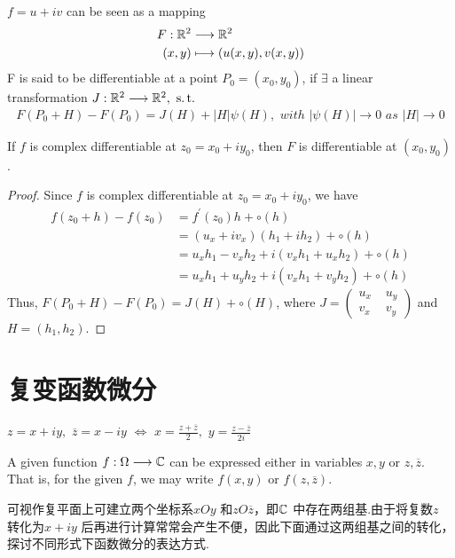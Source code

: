 	\newpage
	$f = u + iv$ can be seen as a mapping
	\begin{align}
		F : \mathbb{R}^2 &\longrightarrow \mathbb{R}^2 \\
		(x , y) &\longmapsto (u(x , y) , v(x , y))
	\end{align}
	F is said to be differentiable at a point $P_0 = (x_0 , y_0)$, if $\exists$ a linear transformation $J : \mathbb{R}^2 \longrightarrow \mathbb{R}^2 , \,\, \operatorname{s.t.}$
	\begin{align}
		F(P_0 + H) - F(P_0) = J(H) + \left| H \right| \psi(H) , \,\, with \,\, \left| \psi(H) \right| \to 0 \,\, as \,\, \left| H \right| \to 0
	\end{align}
	
	\vspace{2em}
	\begin{proposition}\label{prop 2.4.1}
		If $f$ is complex differentiable at $z_0 = x_0 + i y_0$, then $F$ is differentiable at $(x_0 , y_0)$.
		
		\vspace{2em}
		\begin{proof}
			Since $f$ is complex differentiable at $z_0 = x_0 + i y_0$, we have
			\begin{align}
				f(z_0 + h) - f(z_0) 
				&= f^{'}(z_0)h + \circ(h) \\
				&= (u_x + i v_x)(h_1 + i h_2) + \circ(h) \\
				&= u_x h_1 - v_x h_2 + i (v_x h_1 + u_x h_2) + \circ(h) \\
				&= u_x h_1 + u_y h_2 + i (v_x h_1 + v_y h_2) + \circ(h)
			\end{align}
			Thus, $F(P_0 + H) - F(P_0) = J(H) + \circ(H)$, where $J = 
			\begin{pmatrix}
				u_x \,\, &u_y \\
				v_x &v_y
			\end{pmatrix}$ and $H = (h_1 , h_2)$.
		\end{proof}
	\end{proposition}

\newpage
\section{复变函数微分}
	\begin{center}
			$z = x + i y , \,\, \overline{z} = x - i y \,\, \Leftrightarrow \,\, x = \frac{z + \overline{z}}{2} , \,\, y = \frac{z - \overline{z}}{2i}$
	\end{center}
	A given function $f : \Omega \longrightarrow \mathbb{C}$ can be expressed either in variables $x , y$ or $z , \overline{z}$. That is, for the given $f$, we may write $f(x , y)$ or $f(z , \overline{z})$.
	\begin{rmk}
		可视作复平面上可建立两个坐标系$xOy$ 和$zO\overline{z}$，即$\mathbb{C}$ 中存在两组基.由于将复数$z$ 转化为$x + i y$ 后再进行计算常常会产生不便，因此下面通过这两组基之间的转化，探讨不同形式下函数微分的表达方式.
	\end{rmk}
	
